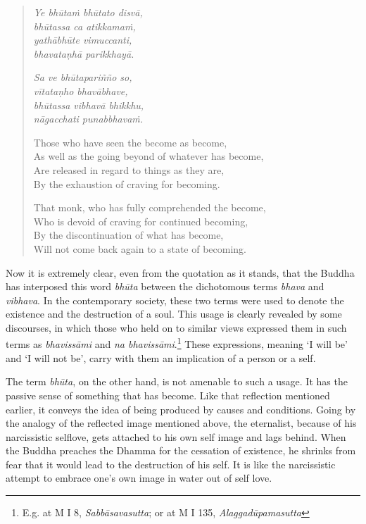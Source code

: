 \begin{quote}
\emph{Ye bhūtaṁ bhūtato disvā,}\\
\emph{bhūtassa ca atikkamaṁ,}\\
\emph{yathābhūte vimuccanti,}\\
\emph{bhavataṇhā parikkhayā.}

\emph{Sa ve bhūtapariñño so,}\\
\emph{vītataṇho bhavābhave,}\\
\emph{bhūtassa vibhavā bhikkhu,}\\
\emph{nāgacchati punabbhavaṁ.}

Those who have seen the become as become,\\
As well as the going beyond of whatever has become,\\
Are released in regard to things as they are,\\
By the exhaustion of craving for becoming.

\clearpage

That monk, who has fully comprehended the become,\\
Who is devoid of craving for continued becoming,\\
By the discontinuation of what has become,\\
Will not come back again to a state of becoming.
\end{quote}

Now it is extremely clear, even from the quotation as it stands, that the Buddha has interposed this word \emph{bhūta} between the dichotomous terms \emph{bhava} and \emph{vibhava}. In the contemporary society, these two terms were used to denote the existence and the destruction of a soul. This usage is clearly revealed by some discourses, in which those who held on to similar views expressed them in such terms as \emph{bhavissāmi} and \emph{na bhavissāmi}.\footnote{E.g. at M I 8, \emph{Sabbāsavasutta}; or at M I 135, \emph{Alaggadūpamasutta}} These expressions, meaning `I will be' and `I will not be', carry with them an implication of a person or a self.

The term \emph{bhūta}, on the other hand, is not amenable to such a usage. It has the passive sense of something that has become. Like that reflection mentioned earlier, it conveys the idea of being produced by causes and conditions. Going by the analogy of the reflected image mentioned above, the eternalist, because of his narcissistic selflove, gets attached to his own self image and lags behind. When the Buddha preaches the Dhamma for the cessation of existence, he shrinks from fear that it would lead to the destruction of his self. It is like the narcissistic attempt to embrace one's own image in water out of self love.

